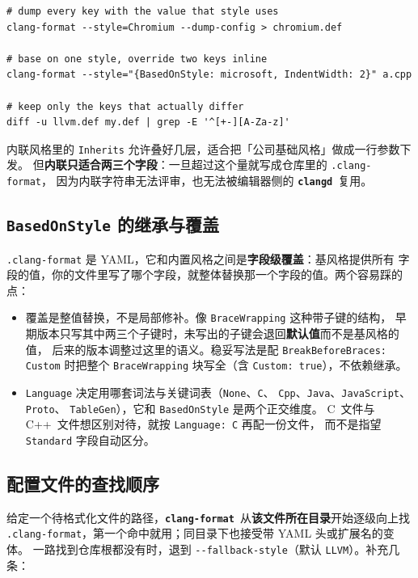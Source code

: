\documentclass[12pt,a4paper,fontset=fandol]{ctexbook}
\newcommand{\Opt}[1]{\texttt{-\/-#1}}
\newcommand{\Lib}[1]{\textbf{\texttt{#1}}}
\newcommand{\Lang}[1]{\textsf{#1}}
\newcommand{\CL}{\Lang{C}}
\newcommand{\CPP}{\Lang{C++}}
\newcommand{\Fmt}{\Lib{clang-format}}
\newcommand{\CD}{\Lib{clangd}}
\begin{document}
\begin{lstlisting}[style=shellstyle,caption={查看内置风格、导出现场生效的配置},label={lst:ch09-dump}]
# dump every key with the value that style uses
clang-format --style=Chromium --dump-config > chromium.def

# base on one style, override two keys inline
clang-format --style="{BasedOnStyle: microsoft, IndentWidth: 2}" a.cpp

# keep only the keys that actually differ
diff -u llvm.def my.def | grep -E '^[+-][A-Za-z]'
\end{lstlisting}

内联风格里的 \texttt{Inherits} 允许叠好几层，适合把「公司基础风格」做成一行参数下发。
但\textbf{内联只适合两三个字段}：一旦超过这个量就写成仓库里的 \texttt{.clang-format}，
因为内联字符串无法评审，也无法被编辑器侧的 \CD\ 复用。

\subsection{\texttt{BasedOnStyle} 的继承与覆盖}\label{sec:ch09-s2-inherit}

\texttt{.clang-format} 是 YAML，它和内置风格之间是\textbf{字段级覆盖}：基风格提供所有
字段的值，你的文件里写了哪个字段，就整体替换那一个字段的值。两个容易踩的点：

\begin{itemize}
  \item 覆盖是整值替换，不是局部修补。像 \texttt{BraceWrapping} 这种带子键的结构，
    早期版本只写其中两三个子键时，未写出的子键会退回\textbf{默认值}而不是基风格的值，
    后来的版本调整过这里的语义。稳妥写法是配 \texttt{BreakBeforeBraces: Custom}
    时把整个 \texttt{BraceWrapping} 块写全（含 \texttt{Custom: true}），不依赖继承。
  \item \texttt{Language} 决定用哪套词法与关键词表（\texttt{None}、\texttt{C}、
    \texttt{Cpp}、\texttt{Java}、\texttt{JavaScript}、\texttt{Proto}、
    \texttt{TableGen}），它和 \texttt{BasedOnStyle} 是两个正交维度。
    \CL\ 文件与 \CPP\ 文件想区别对待，就按 \texttt{Language: C} 再配一份文件，
    而不是指望 \texttt{Standard} 字段自动区分。
\end{itemize}

\subsection{配置文件的查找顺序}\label{sec:ch09-s2-lookup}

给定一个待格式化文件的路径，\Fmt\ 从\textbf{该文件所在目录}开始逐级向上找
\texttt{.clang-format}，第一个命中就用；同目录下也接受带 YAML 头或扩展名的变体。
一路找到仓库根都没有时，退到 \Opt{fallback-style}（默认 \texttt{LLVM}）。补充几条：
\end{document}
